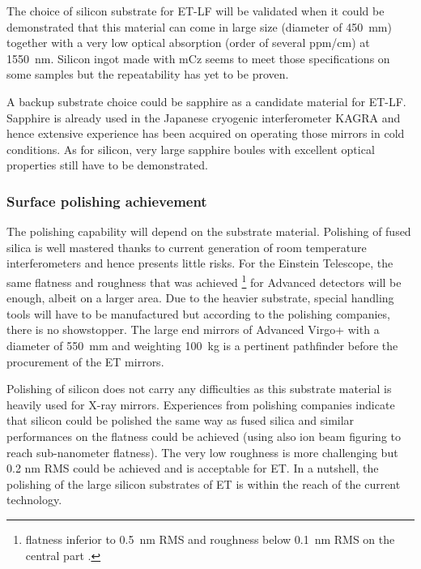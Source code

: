 The choice of silicon substrate for ET-LF will be validated when it could be demonstrated that this material can come in large size (diameter of 450~mm) together with a very low optical absorption (order of several ppm/cm) at 1550~nm. Silicon ingot made with mCz seems to meet those specifications on some samples but the repeatability has yet to be proven.

A backup substrate choice could be sapphire as a candidate material for ET-LF. Sapphire is already used in the Japanese cryogenic interferometer KAGRA and hence extensive experience has been acquired on operating those mirrors \cite{Akutsu_2019} in cold conditions. As for silicon, very large sapphire boules  with excellent optical properties still have to be demonstrated.

\subsubsection{Surface polishing achievement}

The polishing capability will depend on the substrate material. Polishing of fused silica is well mastered thanks to current generation of room temperature interferometers and hence presents little risks. For the Einstein Telescope, the same flatness and roughness that was achieved \footnote{flatness inferior to 0.5~nm RMS and roughness below 0.1~nm RMS on the central part \cite{pinard2017mirrors}.} for Advanced detectors will be enough, albeit on a larger area. Due to the heavier substrate, special handling tools will have to be manufactured but according to the polishing companies, there is no showstopper. The large end mirrors of Advanced Virgo+ with a diameter of 550~mm and weighting 100~kg is  a pertinent pathfinder before the procurement of the ET mirrors.

Polishing of silicon does not carry any difficulties as this substrate material is heavily used for X-ray mirrors. Experiences from polishing companies indicate that silicon could be polished the same way as fused silica and similar performances on the flatness could be achieved (using also ion beam figuring to reach sub-nanometer flatness). The very low roughness is more challenging but 0.2 nm RMS could be achieved and is acceptable for ET. In a nutshell, the polishing of the large silicon substrates of ET is within the reach of the current technology.

